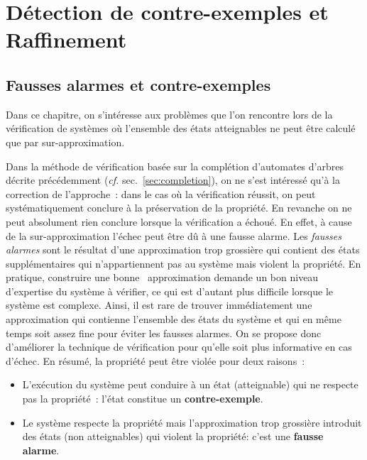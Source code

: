 \chapter{Détection de contre-exemples et Raffinement}
\section{Fausses alarmes et contre-exemples}


Dans ce chapitre, on s'intéresse aux problèmes que l'on rencontre lors de la vérification de systèmes
où l'ensemble des états atteignables ne peut être calculé que par sur-approximation.

Dans la méthode de vérification basée sur la complétion d'automates d'arbres décrite précédemment
(\textit{cf.} sec.~\ref{sec:completion}), on ne s'est intéressé qu'à la correction de l'approche~:
dans le cas où la vérification réussit, on peut systématiquement  conclure à la préservation
de la propriété. En revanche on ne peut absolument rien conclure lorsque la vérification a échoué.
En effet, à cause de la sur-approximation l'échec peut être dû à une fausse alarme. Les \emph{fausses alarmes} sont
le résultat d'une approximation trop grossière qui contient des états supplémentaires qui n'appartiennent pas au 
système mais violent la propriété. %
En pratique, construire une \og bonne \fg\ approximation demande un bon niveau d'expertise du système à vérifier, 
ce qui est d'autant plus difficile lorsque le système est complexe. 
Ainsi, il est rare de trouver immédiatement une approximation qui contienne l'ensemble des états du système et qui en
même temps soit assez fine pour éviter les fausses alarmes. On se propose donc d'améliorer la technique de vérification
pour qu'elle soit plus informative en cas d'échec. En résumé, la propriété peut être violée pour deux raisons~:\\

\begin{itemize}
\item L'exécution du système peut conduire à un état (atteignable) qui ne
  respecte pas la propriété~: l'état constitue un \textbf{contre-exemple}.
  
\item Le système respecte la propriété mais l'approximation trop
  grossière introduit des états (non atteignables) qui violent la
  propriété: c'est une \textbf{fausse alarme}.\\
\end{itemize}


